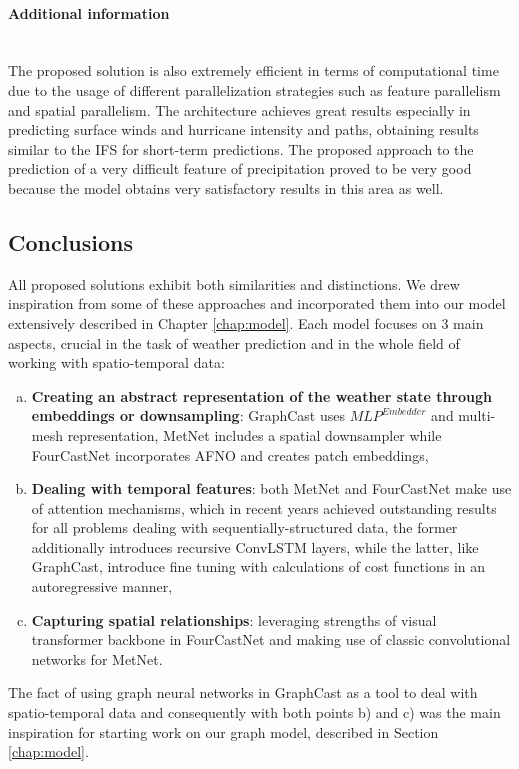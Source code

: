 \paragraph{Additional information} \mbox{} \\
\noindent The proposed solution is also extremely efficient in terms of computational time due to the usage of different parallelization strategies such as feature parallelism and spatial parallelism. The architecture achieves great results especially in predicting surface winds and hurricane intensity and paths, obtaining results similar to the IFS \cite{ECMWFIFS} for short-term predictions. The proposed approach to the prediction of a very difficult feature of precipitation proved to be very good because the model obtains very satisfactory results in this area as well.

\subsection{Conclusions}
All proposed solutions exhibit both similarities and distinctions. We drew inspiration from some of these approaches and incorporated them into our model extensively described in Chapter \ref{chap:model}. Each model focuses on 3 main aspects, crucial in the task of weather prediction and in the whole field of working with spatio-temporal data:
\begin{enumerate}[a)]
    \item \textbf{Creating an abstract representation of the weather state through embeddings or downsampling}: GraphCast uses $MLP^{Embedder}$ and multi-mesh representation, MetNet includes a spatial downsampler while FourCastNet incorporates AFNO and creates patch embeddings,
    \item \textbf{Dealing with temporal features}: both MetNet and FourCastNet make use of attention mechanisms, which in recent years achieved outstanding results for all problems dealing with sequentially-structured data, the former additionally introduces recursive ConvLSTM layers, while the latter, like GraphCast, introduce fine tuning with calculations of cost functions in an autoregressive manner,
    \item \textbf{Capturing spatial relationships}: leveraging strengths of visual transformer backbone in FourCastNet and making use of classic convolutional networks for MetNet.
\end{enumerate}

The fact of using graph neural networks in GraphCast as a tool to deal with spatio-temporal data and consequently with both points b) and c) was the main inspiration for starting work on our graph model, described in Section \ref{chap:model}.

